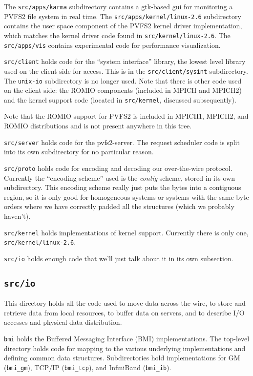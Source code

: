 The \texttt{src/apps/karma} subdirectory contains a gtk-based
gui for monitoring a PVFS2 file system in real time.  The
\texttt{src/apps/kernel/linux-2.6} subdirectory contains the
user space component of the PVFS2 kernel driver implementation, which
matches the kernel driver code found in \texttt{src/kernel/linux-2.6}.
The \texttt{src/apps/vis} contains experimental code for performance
visualization.

\texttt{src/client} holds code for the ``system interface'' library, the
lowest level library used on the client side for access.  This is in the
\texttt{src/client/sysint} subdirectory.  The \texttt{unix-io} subdirectory is
no longer used.  Note that there is other code used on the client side: the
ROMIO components (included in MPICH and MPICH2) and the kernel support code
(located in \texttt{src/kernel}, discussed subsequently).

Note that the ROMIO support for PVFS2 is included in MPICH1, MPICH2, and ROMIO
distributions and is not present anywhere in this tree.

\texttt{src/server} holds code for the pvfs2-server.  The request scheduler
code is split into its own subdirectory for no particular reason.

\texttt{src/proto} holds code for encoding and decoding our over-the-wire
protocol.  Currently the ``encoding scheme'' used is the \emph{contig}
scheme, stored in its own subdirectory.  This encoding scheme really just puts
the bytes into a contiguous region, so it is only good for homogeneous systems
or systems with the same byte orders where we have correctly padded all the
structures (which we probably haven't).

\texttt{src/kernel} holds implementations of kernel support.  Currently there
is only one, \texttt{src/kernel/linux-2.6}.

\texttt{src/io} holds enough code that we'll just talk about it in its own
subsection.

\subsection{\texttt{src/io}}

This directory holds all the code used to move data across the wire, to store
and retrieve data from local resources, to buffer data on servers, and to
describe I/O accesses and physical data distribution.

\texttt{bmi} holds the Buffered Messaging Interface (BMI) implementations.
The top-level directory holds code for mapping to the various underlying
implementations and defining common data structures.  Subdirectories hold
implementations for GM (\texttt{bmi\_gm}), TCP/IP (\texttt{bmi\_tcp}), and
InfiniBand (\texttt{bmi\_ib}).

